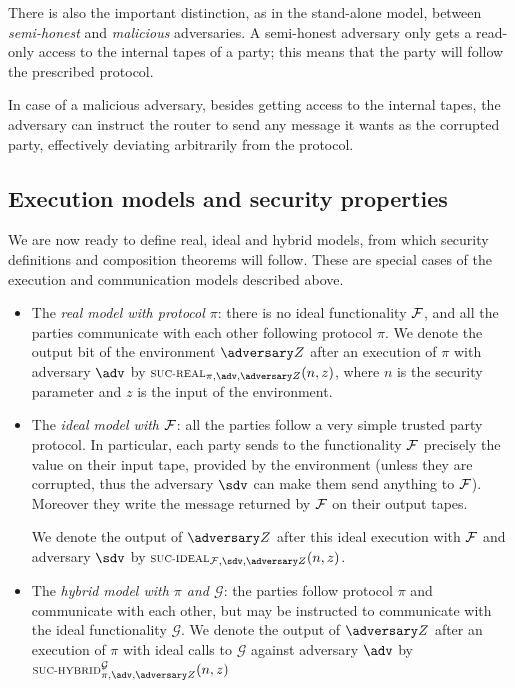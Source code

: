 There is also the important distinction, as in the stand-alone model, between \emph{semi-honest} and \emph{malicious} adversaries. A semi-honest adversary only gets a read-only access to the internal tapes of a party; this means that the party will follow the prescribed protocol.

In case of a malicious adversary, besides getting access to the internal tapes, the adversary can instruct the router to send any message it wants as the corrupted party, effectively deviating arbitrarily from the protocol.

\subsection{Execution models and security properties}

We are now ready to define real, ideal and hybrid models, from which security definitions and composition theorems will follow. These are special cases of the execution and communication models described above.

\begin{itemize}
    \item The \emph{real model with protocol $\pi$}: there is no ideal functionality $\mathcal{F}$, and all the parties communicate with each other following protocol $\pi$. We denote the output bit of the environment $\zdv$ after an execution of $\pi$ with adversary $\adv$ by $\textsc{\scriptsize SUC-REAL}_{\pi,\adv,\zdv}(n,z)$, where $n$ is the security parameter and $z$ is the input of the environment.
    \item The \emph{ideal model with $\mathcal{F}$}: all the parties follow a very simple trusted party protocol. In particular, each party sends to the functionality $\mathcal{F}$ precisely the value on their input tape, provided by the environment (unless they are corrupted, thus the adversary $\sdv$ can make them send anything to $\mathcal{F}$). Moreover they write the message returned by $\mathcal{F}$ on their output tapes.
    
    We denote the output of $\zdv$ after this ideal execution with $\mathcal{F}$ and adversary $\sdv$ by $\textsc{\scriptsize SUC-IDEAL}_{\Fun,\sdv,\zdv}(n,z)$.
    
    \item The \emph{hybrid model with $\pi$ and $\mathcal G$}: the parties follow protocol $\pi$ and communicate with each other, but may be instructed to communicate with the ideal functionality $\mathcal G$. We denote the output of $\zdv$ after an execution of $\pi$ with ideal calls to $\mathcal G$ against adversary $\adv$ by $\textsc{\scriptsize SUC-HYBRID}^{\mathcal G}_{\pi,\adv,\zdv}(n,z)$
\end{itemize}

